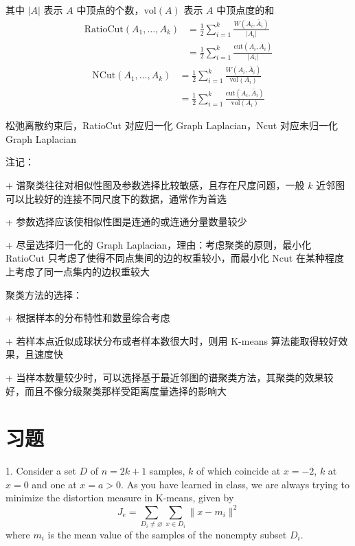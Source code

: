 \documentclass[openany]{ctexbook}
\theoremstyle{kaiti}
\theoremstyle{normal}
\begin{document}
其中 $|A|$ 表示 $A$ 中顶点的个数，$\mathrm{vol}\left(A \right)$ 表示 $A$ 中顶点度的和
\begin{equation}
\begin{aligned}
  \mathrm{RatioCut}\left(A_1,\dots ,A_k \right)
  &=\frac{1}{2}\sum_{i=1}^k{\frac{W\left(A_i,\bar{A}_i \right)}{|A_i|}}\\
  &=\frac{1}{2}\sum_{i=1}^k{\frac{\mathrm{cut}\left(A_i,\bar{A}_i \right)}{|A_i|}}
\end{aligned}
\end{equation}
\begin{equation}
\begin{aligned}
  \mathrm{NCut}\left(A_1,\dots ,A_k \right)
  &=\frac{1}{2}\sum_{i=1}^k{\frac{W\left(A_i,\bar{A}_i \right)}{\mathrm{vol}\left(A_i \right)}}\\
  &=\frac{1}{2}\sum_{i=1}^k{\frac{\mathrm{cut}\left(A_i,\bar{A}_i \right)}{\mathrm{vol}\left(A_i \right)}}
\end{aligned}
\end{equation}

松弛离散约束后，RatioCut 对应归一化 Graph Laplacian，Ncut 对应未归一化 Graph Laplacian

注记：

+ 谱聚类往往对相似性图及参数选择比较敏感，且存在尺度问题，一般 $k$ 近邻图可以比较好的连接不同尺度下的数据，通常作为首选

+ 参数选择应该使相似性图是连通的或连通分量数量较少

+ 尽量选择归一化的 Graph Laplacian，理由：考虑聚类的原则，最小化 RatioCut 只考虑了使得不同点集间的边的权重较小，而最小化 Ncut 在某种程度上考虑了同一点集内的边权重较大

聚类方法的选择：

+ 根据样本的分布特性和数量综合考虑

+ 若样本点近似成球状分布或者样本数很大时，则用 K-means 算法能取得较好效果，且速度快

+ 当样本数量较少时，可以选择基于最近邻图的谱聚类方法，其聚类的效果较好，而且不像分级聚类那样受距离度量选择的影响大

\section{习题}


1. Consider a set $D$ of $n=2k+1$ samples, $k$ of which coincide at $x=-2$, $k$ at $x=0$ and one at $x=a>0$. As you have learned in class, we are always trying to minimize the distortion measure in K-means, given by
\begin{equation}
  J_{e}=\sum_{D_{i}\neq\varnothing}\sum_{x\in D_{i}}\|x-m_{i}\|^2
\end{equation}
where $m_i$ is the mean value of the samples of the nonempty subset $D_i$.
\end{document}
